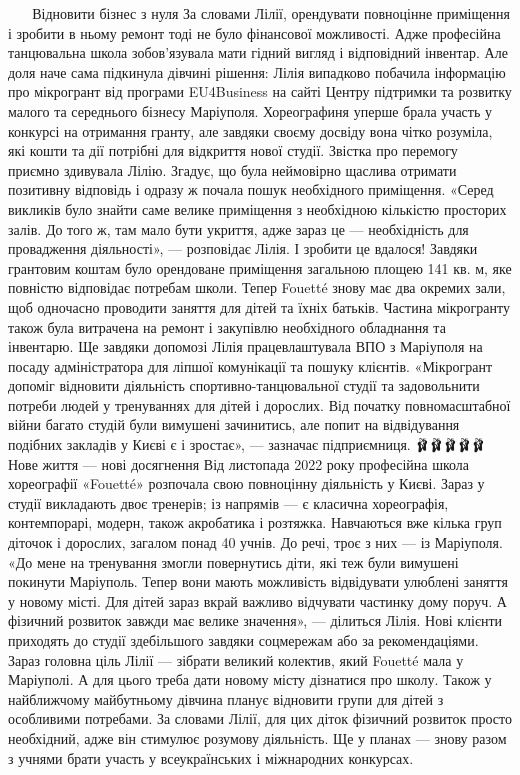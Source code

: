 👣👣👣👣👣 Відновити бізнес з нуля
За словами Лілії, орендувати повноцінне приміщення і зробити в ньому ремонт тоді не було фінансової можливості. Адже професійна танцювальна школа зобов’язувала мати гідний вигляд і відповідний інвентар. Але доля наче сама підкинула дівчині рішення: Лілія випадково побачила інформацію про мікрогрант від програми EU4Business на сайті Центру підтримки та розвитку малого та середнього бізнесу Маріуполя.
Хореографиня уперше брала участь у конкурсі на отримання гранту, але завдяки своєму досвіду вона чітко розуміла, які кошти та дії потрібні для відкриття нової студії. Звістка про перемогу приємно здивувала Лілію. Згадує, що була неймовірно щаслива отримати позитивну відповідь і одразу ж почала пошук необхідного приміщення.
«Серед викликів було знайти саме велике приміщення з необхідною кількістю просторих залів. До того ж, там мало бути укриття, адже зараз це — необхідність для провадження діяльності», — розповідає Лілія.
І зробити це вдалося! Завдяки грантовим коштам було орендоване приміщення загальною площею 141 кв. м, яке повністю відповідає потребам школи. Тепер Fouetté знову має два окремих зали, щоб одночасно проводити заняття для дітей та їхніх батьків. Частина мікрогранту також була витрачена на ремонт і закупівлю необхідного обладнання та інвентарю. Ще завдяки допомозі Лілія працевлаштувала ВПО з Маріуполя на посаду адміністратора для ліпшої комунікації та пошуку клієнтів.
«Мікрогрант допоміг відновити діяльність спортивно-танцювальної студії та задовольнити потреби людей у тренуваннях для дітей і дорослих. Від початку повномасштабної війни багато студій були вимушені зачинитись, але попит на
відвідування подібних закладів у Києві є і зростає», — зазначає підприємниця.
🩰🩰🩰🩰🩰 Нове життя — нові досягнення
Від листопада 2022 року професійна школа хореографії «Fouetté» розпочала свою повноцінну діяльність у Києві. 
Зараз у студії викладають двоє тренерів; із напрямів — є класична хореографія, контемпорарі, модерн, також акробатика і розтяжка. Навчаються вже кілька груп діточок і дорослих, загалом понад 40 учнів. До речі, троє з них — із Маріуполя.
«До мене на тренування змогли повернутись діти, які теж були вимушені покинути Маріуполь. Тепер вони мають можливість відвідувати улюблені заняття у новому місті. Для дітей зараз вкрай важливо відчувати частинку дому поруч. А фізичний розвиток завжди має велике значення», — ділиться Лілія.
Нові клієнти приходять до студії здебільшого завдяки соцмережам або за рекомендаціями. Зараз головна ціль Лілії — зібрати великий колектив, який Fouetté мала у Маріуполі. А для цього треба дати новому місту дізнатися про школу. Також у найближчому майбутньому дівчина планує відновити групи для дітей з особливими потребами. За словами Лілії, для цих діток фізичний розвиток просто необхідний, адже він стимулює розумову діяльність. Ще у планах — знову разом з учнями брати участь у всеукраїнських і міжнародних конкурсах.
